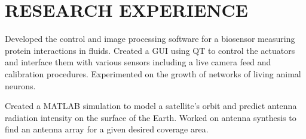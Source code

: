 \documentclass{ResumeTemplate}
\begin{document}
\begin{minipage}[c]{0.61\linewidth}
        \vspace*{\baselineskip}

        \section{RESEARCH EXPERIENCE}
        

        
        
        \workitemsthree
        {Developed the control and image processing software for a biosensor measuring protein interactions in fluids.}
        {Created a GUI using QT to control the actuators and interface them with various sensors including a live camera feed and calibration procedures.}
        {Experimented on the growth of networks of living animal neurons.}
        
        
        \workitemsone
        {Created a MATLAB simulation to model a satellite's orbit and predict antenna radiation intensity on the surface of the Earth. Worked on antenna synthesis to find an antenna array for a given desired coverage area.}

        

        

    \end{minipage}
        
\end{document}
